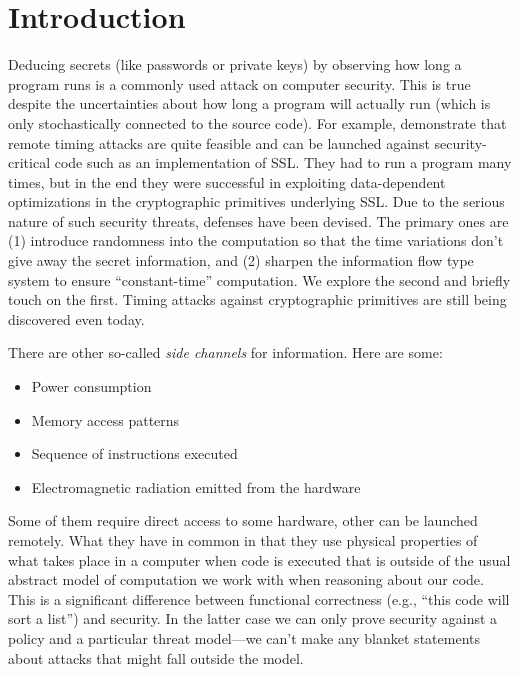 \documentclass[11pt]{article}
\begin{document}
\maketitle

\section{Introduction}

Deducing secrets (like passwords or private keys) by observing how long a
program runs is a commonly used attack on computer security.  This is true
despite the uncertainties about how long a program will actually run (which is
only stochastically connected to the source code).  For example,
\citet{Brumley05cn} demonstrate that remote timing attacks are quite feasible
and can be launched against security-critical code such as an implementation of
SSL\@.  They had to run a program many times, but in the end they were
successful in exploiting data-dependent optimizations in the cryptographic
primitives underlying SSL\@.  Due to the serious nature of such security
threats, defenses have been devised.  The primary ones are (1) introduce
randomness into the computation so that the time variations don't give away the
secret information, and (2) sharpen the information flow type system to ensure
``constant-time'' computation.  We explore the second and briefly touch on the
first.  Timing attacks against cryptographic primitives are still being
discovered even today.

There are other so-called \emph{side channels} for information.  Here are
some:
\begin{itemize}
\item Power consumption
\item Memory access patterns
\item Sequence of instructions executed
\item Electromagnetic radiation emitted from the hardware
\end{itemize}
Some of them require direct access to some hardware, other can be launched
remotely.  What they have in common in that they use physical properties of what
takes place in a computer when code is executed that is outside of the usual
abstract model of computation we work with when reasoning about our code.  This
is a significant difference between functional correctness (e.g., ``this code
will sort a list'') and security.  In the latter case we can only prove security
against a policy and a particular threat model---we can't make any blanket
statements about attacks that might fall outside the model.
\end{document}
